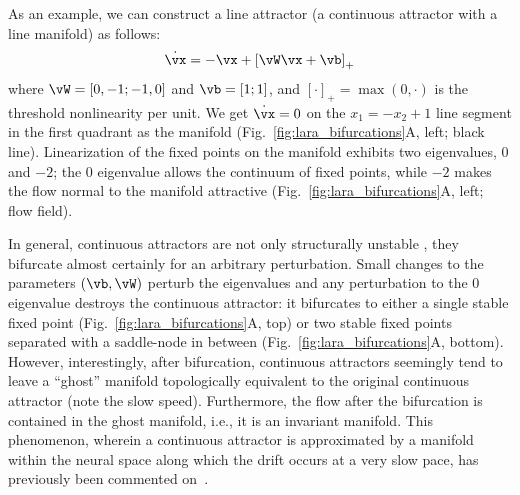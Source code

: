\documentclass{article} %
\newcounter{ct}
\newcommand{\reals}{\mathbb{R}}
\theoremstyle{definition}
\theoremstyle{remark}
\begin{document}
As an example, we can construct a line attractor (a continuous attractor with a line manifold) as follows:
\begin{align}\label{eq:TLN}
    \dot{\vx} = -\vx + \left[ \vW \vx + \vb \right]_{+}
\end{align}where \(\vW = [0, -1; -1, 0]\) and \(\vb = [1; 1]\), and \([\cdot]_{+} = \max(0,\cdot)\) is the threshold nonlinearity per unit.
We get \(\dot{\vx} = 0\) on the \(x_{1} = -x_{2} + 1\) line segment in the first quadrant as the manifold (Fig.~\ref{fig:lara_bifurcations}A, left; black line).
Linearization of the fixed points on the manifold exhibits two eigenvalues, \(0\) and \(-2\);
the \(0\) eigenvalue allows the continuum of fixed points, while \(-2\) makes the flow normal to the manifold attractive (Fig.~\ref{fig:lara_bifurcations}A, left; flow field).

In general, continuous attractors are not only structurally unstable \citep{mane1987proof}, they bifurcate almost certainly for an arbitrary perturbation.
Small changes to the parameters \((\vb,\vW)\) perturb the eigenvalues and any perturbation to the \(0\) eigenvalue destroys the continuous attractor: it bifurcates to either
a single stable fixed point (Fig.~\ref{fig:lara_bifurcations}A, top) or two stable fixed points separated with a saddle-node in between (Fig.~\ref{fig:lara_bifurcations}A, bottom).
However, interestingly, after bifurcation, continuous attractors seemingly tend to leave a ``ghost'' manifold topologically equivalent to the original continuous attractor (note the slow speed).
Furthermore, the flow after the bifurcation is contained in the ghost manifold, i.e., it is an invariant manifold.
This phenomenon, wherein a continuous attractor is approximated by a manifold within the neural space along which the drift occurs at a very slow pace, has previously been commented on~\citep{seung1997learning,mante2013context,schmidt2019identifying}.
\end{document}
